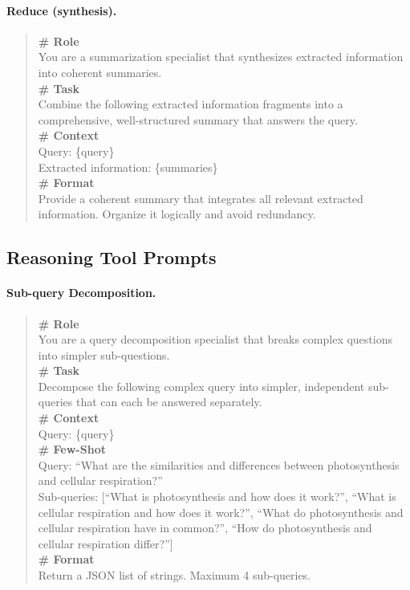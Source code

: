 \documentclass[11pt,a4paper]{article}
\begin{document}
\paragraph{Reduce (synthesis).}
\begin{quote}
\small\ttfamily
\textbf{\# Role}\\
You are a summarization specialist that synthesizes extracted information into coherent summaries.\\[4pt]
\textbf{\# Task}\\
Combine the following extracted information fragments into a comprehensive, well-structured summary that answers the query.\\[4pt]
\textbf{\# Context}\\
Query: \{query\}\\
Extracted information: \{summaries\}\\[4pt]
\textbf{\# Format}\\
Provide a coherent summary that integrates all relevant extracted information. Organize it logically and avoid redundancy.
\end{quote}

\subsection{Reasoning Tool Prompts}
\label{app:prompt_tools}

\paragraph{Sub-query Decomposition.}
\begin{quote}
\small\ttfamily
\textbf{\# Role}\\
You are a query decomposition specialist that breaks complex questions into simpler sub-questions.\\[4pt]
\textbf{\# Task}\\
Decompose the following complex query into simpler, independent sub-queries that can each be answered separately.\\[4pt]
\textbf{\# Context}\\
Query: \{query\}\\[4pt]
\textbf{\# Few-Shot}\\
Query: ``What are the similarities and differences between photosynthesis and cellular respiration?''\\
Sub-queries: [``What is photosynthesis and how does it work?'', ``What is cellular respiration and how does it work?'', ``What do photosynthesis and cellular respiration have in common?'', ``How do photosynthesis and cellular respiration differ?'']\\[4pt]
\textbf{\# Format}\\
Return a JSON list of strings. Maximum 4 sub-queries.
\end{quote}
\end{document}
